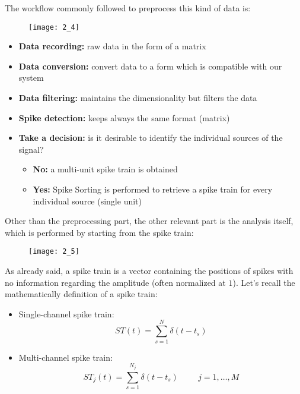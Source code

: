 The workflow commonly followed to preprocess this kind of data is:
\begin{figure}[H]
    \texttt{[image: 2\_4]}
    \centering
\end{figure}
\begin{itemize}
    \item \textbf{Data recording:} raw data in the form of a matrix
    \item \textbf{Data conversion:} convert data to a form which is compatible with our system
    \item \textbf{Data filtering:} maintains the dimensionality but filters the data
    \item \textbf{Spike detection:} keeps always the same format (matrix)
    \item \textbf{Take a decision:} is it desirable to identify the individual sources of the signal?
          \begin{itemize}
              \item \textbf{No:} a multi-unit spike train is obtained
              \item \textbf{Yes:} Spike Sorting is performed to retrieve a spike train for
                    every individual source (single unit)
          \end{itemize}
\end{itemize}
Other than the preprocessing part, the other relevant part is the analysis itself, which is performed
by starting from the spike train:
\begin{figure}[H]
    \texttt{[image: 2\_5]}
    \centering
\end{figure}
As already said, a spike train is a vector containing the positions of spikes with no information
regarding the amplitude (often normalized at \(1\)).
Let's recall the mathematically definition of a spike train:
\begin{itemize}
    \item Single-channel spike train:
          \begin{equation*}
              ST(t)=\sum_{s=1}^{N}\delta{(t-t_s)}
          \end{equation*}
    \item Multi-channel spike train:
          \begin{equation*}
              ST_j(t)=\sum_{s=1}^{N_j}\delta(t-t_s) \hspace{1cm} j=1,\dots,M
          \end{equation*}
\end{itemize}
